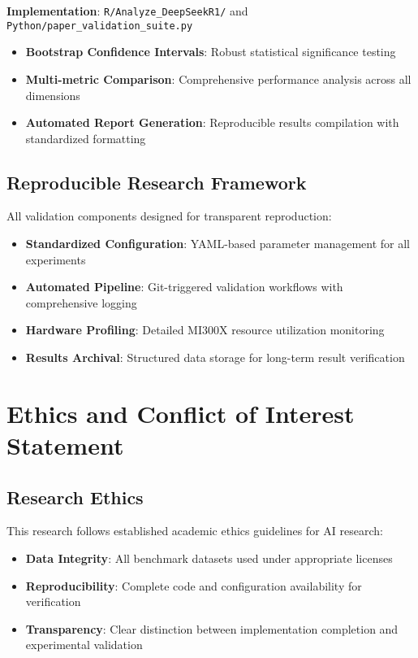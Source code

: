 \documentclass[12pt,a4paper]{article}
\begin{document}
\textbf{Implementation}: \texttt{R/Analyze\_DeepSeekR1/} and \texttt{Python/paper\_validation\_suite.py}

\begin{itemize}
\item \textbf{Bootstrap Confidence Intervals}: Robust statistical significance testing
\item \textbf{Multi-metric Comparison}: Comprehensive performance analysis across all dimensions
\item \textbf{Automated Report Generation}: Reproducible results compilation with standardized formatting
\end{itemize}

\subsection{Reproducible Research Framework}

All validation components designed for transparent reproduction:

\begin{itemize}
\item \textbf{Standardized Configuration}: YAML-based parameter management for all experiments
\item \textbf{Automated Pipeline}: Git-triggered validation workflows with comprehensive logging
\item \textbf{Hardware Profiling}: Detailed MI300X resource utilization monitoring
\item \textbf{Results Archival}: Structured data storage for long-term result verification
\end{itemize}

\section{Ethics and Conflict of Interest Statement}

\subsection{Research Ethics}

This research follows established academic ethics guidelines for AI research:

\begin{itemize}
\item \textbf{Data Integrity}: All benchmark datasets used under appropriate licenses
\item \textbf{Reproducibility}: Complete code and configuration availability for verification
\item \textbf{Transparency}: Clear distinction between implementation completion and experimental validation
\end{itemize}
\end{document}
